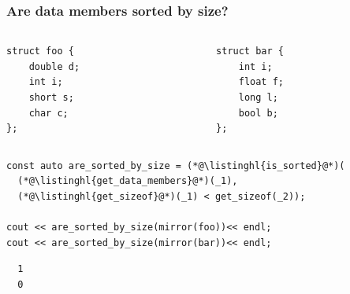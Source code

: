 \documentclass[compress,table,xcolor=table]{beamer}
\begin{document}
\begin{frame}[fragile]
  \frametitle{Are data members sorted by size?}
  \begin{columns}
    \begin{column}{.45\textwidth}
      \begin{lstlisting}[language=c++2x,basicstyle=\small\ttfamily]
struct foo {
    double d;
    int i;
    short s;
    char c;
};
      \end{lstlisting}
    \end{column}
    \begin{column}{.45\textwidth}
      \begin{lstlisting}[language=c++2x,basicstyle=\small\ttfamily]
struct bar {
    int i;
    float f;
    long l;
    bool b;
};
      \end{lstlisting}
    \end{column}
  \end{columns}
  \begin{lstlisting}[language=c++2x,basicstyle=\small\ttfamily]
const auto are_sorted_by_size = (*@\listinghl{is_sorted}@*)(
  (*@\listinghl{get_data_members}@*)(_1),
  (*@\listinghl{get_sizeof}@*)(_1) < get_sizeof(_2));

cout << are_sorted_by_size(mirror(foo))<< endl;
cout << are_sorted_by_size(mirror(bar))<< endl;
  \end{lstlisting}
  \begin{verbatim}
  1
  0
  \end{verbatim}
\end{frame}
\end{document}
